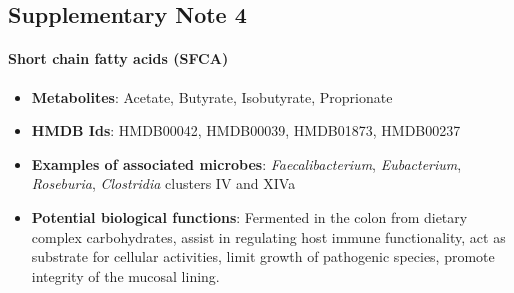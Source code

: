 \subsection{Supplementary Note 4} \label{appB_note4}

\paragraph{Short chain fatty acids (SFCA)}  
\begin{itemize}
    \item \textbf{Metabolites}: Acetate, Butyrate, Isobutyrate, Proprionate 
    \item \textbf{HMDB Ids}: HMDB00042, HMDB00039, HMDB01873, HMDB00237 
    \item \textbf{Examples of associated microbes}: \emph{Faecalibacterium}, \emph{Eubacterium}, \emph{Roseburia}, \emph{Clostridia} clusters IV and XIVa \cite{nicholson2012hostgut} 
    \item \textbf{Potential biological functions}: Fermented in the colon from dietary complex carbohydrates, assist in regulating host immune functionality, act as substrate for cellular activities, limit growth of pathogenic species, promote integrity of the mucosal lining.
\end{itemize}

